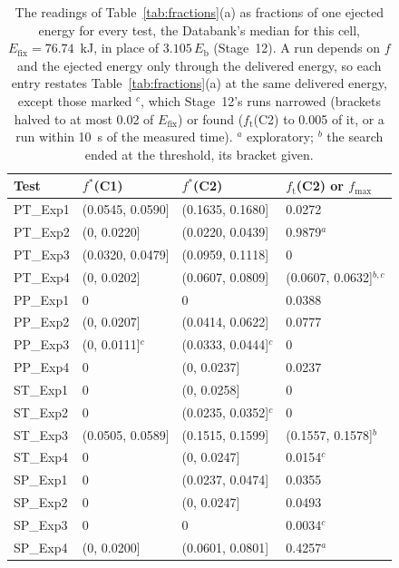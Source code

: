 \documentclass[preprint,12pt]{elsarticle}
\begin{document}
\begin{table}[!tbp]
\centering
\scriptsize
\caption{The readings of Table~\ref{tab:fractions}(a) as fractions of one ejected energy for every test, the Databank's median for this cell, $E_\mathrm{fix}=76.74$~kJ, in place of $3.105\,E_\mathrm{b}$ (Stage~12). A run depends on $f$ and the ejected energy only through the delivered energy, so each entry restates Table~\ref{tab:fractions}(a) at the same delivered energy, except those marked $^{c}$, which Stage~12's runs narrowed (brackets halved to at most 0.02 of $E_\mathrm{fix}$) or found ($f_\mathrm{t}$(C2) to 0.005 of it, or a run within 10~s of the measured time). $^{a}$ exploratory; $^{b}$ the search ended at the threshold, its bracket given.}
\label{tab:fractions-fixed}
\begin{tabular}{llll}
\toprule
Test & $f^*$(C1) & $f^*$(C2) & $f_\mathrm{t}$(C2) or $f_\mathrm{max}$ \\
\midrule
PT\_Exp1 & (0.0545, 0.0590] & (0.1635, 0.1680] & 0.0272 \\
PT\_Exp2 & (0, 0.0220] & (0.0220, 0.0439] & 0.9879$^{a}$ \\
PT\_Exp3 & (0.0320, 0.0479] & (0.0959, 0.1118] & 0 \\
PT\_Exp4 & (0, 0.0202] & (0.0607, 0.0809] & (0.0607, 0.0632]$^{b,c}$ \\
PP\_Exp1 & 0 & 0 & 0.0388 \\
PP\_Exp2 & (0, 0.0207] & (0.0414, 0.0622] & 0.0777 \\
PP\_Exp3 & (0, 0.0111]$^{c}$ & (0.0333, 0.0444]$^{c}$ & 0 \\
PP\_Exp4 & 0 & (0, 0.0237] & 0.0237 \\
ST\_Exp1 & 0 & (0, 0.0258] & 0 \\
ST\_Exp2 & 0 & (0.0235, 0.0352]$^{c}$ & 0 \\
ST\_Exp3 & (0.0505, 0.0589] & (0.1515, 0.1599] & (0.1557, 0.1578]$^{b}$ \\
ST\_Exp4 & 0 & (0, 0.0247] & 0.0154$^{c}$ \\
SP\_Exp1 & 0 & (0.0237, 0.0474] & 0.0355 \\
SP\_Exp2 & 0 & (0, 0.0247] & 0.0493 \\
SP\_Exp3 & 0 & 0 & 0.0034$^{c}$ \\
SP\_Exp4 & (0, 0.0200] & (0.0601, 0.0801] & 0.4257$^{a}$ \\
\bottomrule
\end{tabular}
\end{table}
\end{document}
